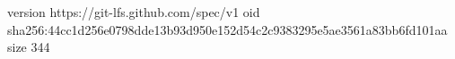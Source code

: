 version https://git-lfs.github.com/spec/v1
oid sha256:44cc1d256e0798dde13b93d950e152d54c2c9383295e5ae3561a83bb6fd101aa
size 344
